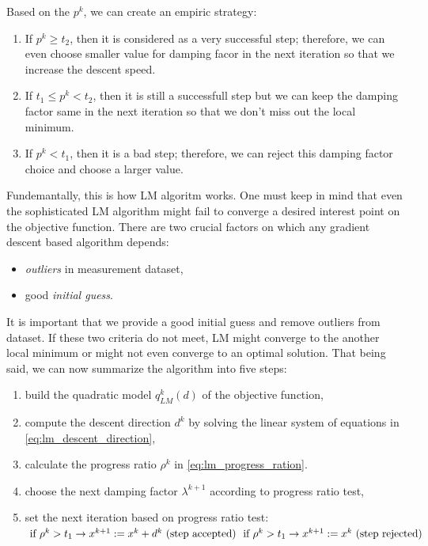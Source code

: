 \documentclass[a4paper]{report}
\numberwithin{figure}{section}
\begin{document}
Based on the $p^k$, we can create an empiric strategy:

\begin{enumerate}
  \item If $p^k \geq t_2$, then it is considered as a very successful step; 
    therefore, we can even choose smaller value for damping facor in the next iteration 
    so that 
    we increase the descent speed.
  \item If $t_1 \leq p^k < t_2$, then it is still a successfull step but we 
    can keep the damping factor same in the next iteration so that we don't 
    miss out the local minimum.
  \item If $p^k < t_1$, then it is a bad step; therefore, we can reject this 
    damping factor choice and choose a larger value.
\end{enumerate}

Fundemantally, this is how LM algoritm works. 
One must keep in mind that even the sophisticated LM algorithm might fail to 
converge a desired interest point on the objective function.
There are two crucial factors on which any gradient descent based algorithm depends:
\begin{itemize}
  \item \textit{outliers} in measurement dataset,
  \item good \textit{initial guess}. 
\end{itemize}

It is important that we provide a good initial
guess and remove outliers from dataset. 
If these two criteria do not meet, LM might converge to the
another local minimum or might not even converge to
an optimal solution. 
That being said, we can now summarize the algorithm into five steps:

\begin{enumerate}
  \item build the quadratic model $q_{LM}^k(d)$ of the objective function,
  \item compute the descent direction $d^k$ by solving the linear system of 
    equations in \ref{eq:lm_descent_direction},
  \item calculate the progress ratio $\rho^k$ in \ref{eq:lm_progress_ration}.
  \item choose the next damping factor $\lambda^{k+1}$ according to progress ratio test,
  \item set the next iteration based on progress ratio test:
    $\\ \text{  if } \rho^k > t_1 \rightarrow x^{k+1}:=x^k +d^k \text{ (step accepted) }\\ 
    \text{  if }\rho^k > t_1 \rightarrow x^{k+1}:=x^k \text{ (step rejected)}$
\end{enumerate}
\end{document}
